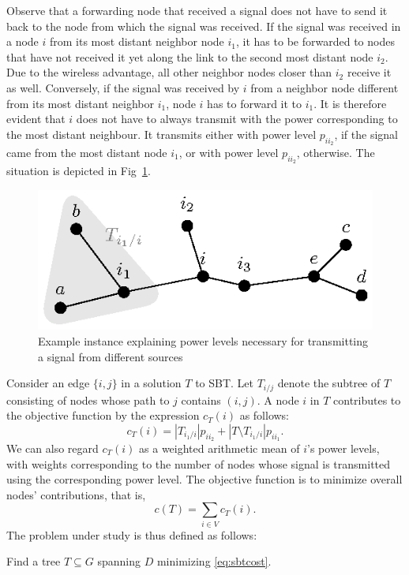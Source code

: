 Observe that a forwarding node that received a signal does not have to send it back to the node from which the signal was received.
If the signal was received in a node $i$ from its most distant neighbor node $i_1$, it has to be forwarded to nodes that have not received it yet along the link to the second most distant node $i_2$.
Due to the wireless advantage, all other neighbor nodes closer than $i_2$ receive it as well.
Conversely, if the signal was received by $i$ from a neighbor node different from its most distant neighbor $i_1$, node $i$ has to forward it to $i_1$. 
It is therefore evident that $i$ does not have to always transmit with the power corresponding to the most distant neighbour.
It transmits either with power level $p_{ii_2}$, if the signal came from the most distant node $i_1$, or with power level $p_{ii_2}$, otherwise.
The situation is depicted in Fig~\ref{fig:objexp}.
\begin{figure}[htb!]
  \centering
  \includegraphics[scale=1.4]{figurer/objexp.eps}
  \caption{Example instance explaining power levels necessary for transmitting a signal from different sources}
  \label{fig:objexp}
\end{figure}

Consider an edge $\{i,j\}$ in a solution $T$ to SBT.
Let $T_{i/j}$ denote the subtree of $T$ consisting of nodes whose path to $j$ contains $(i,j)$. 
A node $i$ in $T$ contributes to the objective function by the expression $c_T(i)$ as follows:
\begin{equation}\label{eq:sbtnodecontr}
c_T(i)=|T_{i_1/i}|p_{ii_2} + |T\setminus T_{i_1/i}|p_{ii_1}.
\end{equation}
We can also regard $c_T(i)$ as a weighted arithmetic mean of $i$'s power levels, with weights corresponding to the number of nodes whose signal is transmitted using the corresponding power level.
The objective function is to minimize overall nodes' contributions, that is,
\begin{equation}
c(T)=\sum\limits_{i\in V}c_T(i).
\label{eq:sbtcost}
\end{equation}
The problem under study is thus defined as follows:
\begin{problem}
Find a tree $T\subseteq G$ spanning $D$ minimizing \eqref{eq:sbtcost}.
\end{problem}

